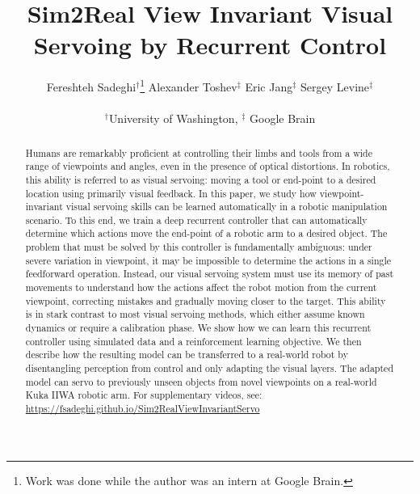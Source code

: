 \documentclass[10pt,twocolumn,letterpaper]{article}
\begin{document}
\title{Sim2Real View Invariant Visual Servoing by Recurrent Control}


\author{Fereshteh Sadeghi$^{\dag}$\thanks{Work was done while the author was an intern at Google Brain. } \hspace{1.2cm} 
Alexander Toshev$^{\ddag}$\hspace{1.2cm} 
Eric Jang$^{\ddag}$\hspace{1.2cm} 
Sergey Levine$^{\ddag}$\hspace{1.2cm} \\
\\
\hspace{-1cm}$^\dag$University of Washington, $^\ddag$ Google Brain\hspace{10cm}\\
}



\maketitle

\begin{abstract}
Humans are remarkably proficient at controlling their limbs and tools from a wide range of viewpoints and angles, even in the presence of optical distortions. In robotics, this ability is referred to as visual servoing: moving a tool or end-point to a desired location using primarily visual feedback. In this paper, we study how viewpoint-invariant visual servoing skills can be learned automatically in a robotic manipulation scenario. To this end, we train a deep recurrent controller that can automatically determine which actions move the end-point of a robotic arm to a desired object. The problem that must be solved by this controller is fundamentally ambiguous: under severe variation in viewpoint, it may be impossible to determine the actions in a single feedforward operation. Instead, our visual servoing system must use its memory of past movements to understand how the actions affect the robot motion from the current viewpoint, correcting mistakes and gradually moving closer to the target. This ability is in stark contrast to most visual servoing methods, which either assume known dynamics or require a calibration phase. We show how we can learn this recurrent controller using simulated data and a reinforcement learning objective. We then describe how the resulting model can be transferred to a real-world robot by disentangling perception from control and only adapting the visual layers. The adapted model can servo to previously unseen objects from novel viewpoints on a real-world Kuka IIWA robotic arm. For supplementary videos, see: \href{https://fsadeghi.github.io/Sim2RealViewInvariantServo}{https://fsadeghi.github.io/Sim2RealViewInvariantServo}
\end{abstract}
\end{document}
